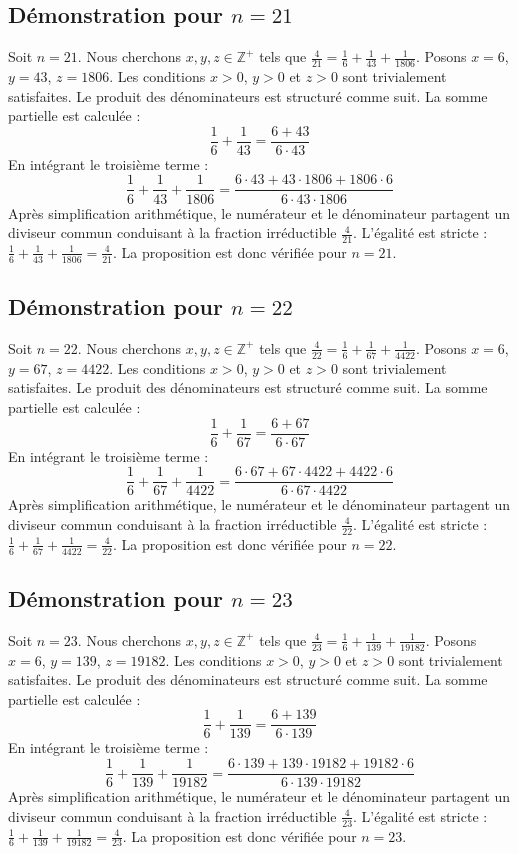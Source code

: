 \documentclass[11pt,a4paper]{article}
\begin{document}
\subsection{Démonstration pour $n = 21$}
Soit $n = 21$. Nous cherchons $x, y, z \in \mathbb{Z}^{+}$ tels que $\frac{4}{21} = \frac{1}{6} + \frac{1}{43} + \frac{1}{1806}$.
Posons $x = 6$, $y = 43$, $z = 1806$.
Les conditions $x > 0$, $y > 0$ et $z > 0$ sont trivialement satisfaites.
Le produit des dénominateurs est structuré comme suit. La somme partielle est calculée :
$$ \frac{1}{6} + \frac{1}{43} = \frac{6+43}{6 \cdot 43} $$
En intégrant le troisième terme :
$$ \frac{1}{6} + \frac{1}{43} + \frac{1}{1806} = \frac{6 \cdot 43 + 43 \cdot 1806 + 1806 \cdot 6}{6 \cdot 43 \cdot 1806} $$
Après simplification arithmétique, le numérateur et le dénominateur partagent un diviseur commun conduisant à la fraction irréductible $\frac{4}{21}$.
L'égalité est stricte : $\frac{1}{6} + \frac{1}{43} + \frac{1}{1806} = \frac{4}{21}$.
La proposition est donc vérifiée pour $n = 21$.
\subsection{Démonstration pour $n = 22$}
Soit $n = 22$. Nous cherchons $x, y, z \in \mathbb{Z}^{+}$ tels que $\frac{4}{22} = \frac{1}{6} + \frac{1}{67} + \frac{1}{4422}$.
Posons $x = 6$, $y = 67$, $z = 4422$.
Les conditions $x > 0$, $y > 0$ et $z > 0$ sont trivialement satisfaites.
Le produit des dénominateurs est structuré comme suit. La somme partielle est calculée :
$$ \frac{1}{6} + \frac{1}{67} = \frac{6+67}{6 \cdot 67} $$
En intégrant le troisième terme :
$$ \frac{1}{6} + \frac{1}{67} + \frac{1}{4422} = \frac{6 \cdot 67 + 67 \cdot 4422 + 4422 \cdot 6}{6 \cdot 67 \cdot 4422} $$
Après simplification arithmétique, le numérateur et le dénominateur partagent un diviseur commun conduisant à la fraction irréductible $\frac{4}{22}$.
L'égalité est stricte : $\frac{1}{6} + \frac{1}{67} + \frac{1}{4422} = \frac{4}{22}$.
La proposition est donc vérifiée pour $n = 22$.
\subsection{Démonstration pour $n = 23$}
Soit $n = 23$. Nous cherchons $x, y, z \in \mathbb{Z}^{+}$ tels que $\frac{4}{23} = \frac{1}{6} + \frac{1}{139} + \frac{1}{19182}$.
Posons $x = 6$, $y = 139$, $z = 19182$.
Les conditions $x > 0$, $y > 0$ et $z > 0$ sont trivialement satisfaites.
Le produit des dénominateurs est structuré comme suit. La somme partielle est calculée :
$$ \frac{1}{6} + \frac{1}{139} = \frac{6+139}{6 \cdot 139} $$
En intégrant le troisième terme :
$$ \frac{1}{6} + \frac{1}{139} + \frac{1}{19182} = \frac{6 \cdot 139 + 139 \cdot 19182 + 19182 \cdot 6}{6 \cdot 139 \cdot 19182} $$
Après simplification arithmétique, le numérateur et le dénominateur partagent un diviseur commun conduisant à la fraction irréductible $\frac{4}{23}$.
L'égalité est stricte : $\frac{1}{6} + \frac{1}{139} + \frac{1}{19182} = \frac{4}{23}$.
La proposition est donc vérifiée pour $n = 23$.
\end{document}

